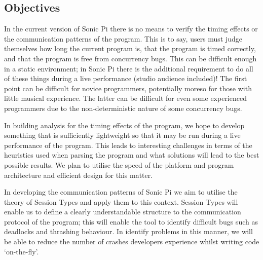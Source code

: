 \documentclass[11pt, abstracton, twoside]{scrartcl}
\begin{document}

\subsection{Objectives}
In the current version of Sonic Pi there is no means to verify the timing effects
or the communication patterns of the program. This is to say, users must judge
themselves how long the current program is, that the program is timed correctly,
and that the program is free from concurrency bugs. This can be difficult enough 
in a static environment; in Sonic Pi there is the additional requirement to do 
all of these things during a live performance (studio audience included)! The 
first point can be difficult for novice programmers, potentially moreso for 
those with little musical experience. The latter can be difficult for even some 
experienced programmers due to the non-deterministic nature of some concurrency 
bugs.

In building analysis for the timing effects of the program, we hope to develop
something that is sufficiently lightweight so that it may be run during a live 
performance of the program. This leads to interesting challenges in terms of the 
heuristics used when parsing the program and what solutions will lead to the best 
possible results. We plan to utilise the speed of the platform and program 
architecture and efficient design for this matter.

In developing the communication patterns of Sonic Pi we aim to utilise the
theory of Session Types and apply them to this context. Session Types will
enable us to define a clearly understandable structure to the communication
protocol of the program; this will enable the tool to identify difficult bugs
such as deadlocks and thrashing behaviour. In identify problems in this manner,
we will be able to reduce the number of crashes developers experience whilst 
writing code `on-the-fly'.
\end{document}
